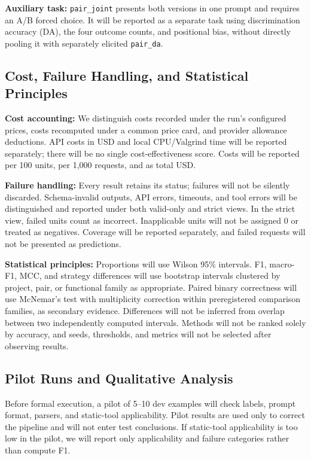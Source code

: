 \documentclass[conference]{IEEEtran}
\begin{document}
\textbf{Auxiliary task:} \texttt{pair\_joint} presents both versions in one prompt and requires an A/B forced choice. It will be reported as a separate task using discrimination accuracy (DA), the four outcome counts, and positional bias, without directly pooling it with separately elicited \texttt{pair\_da}.

\subsection{Cost, Failure Handling, and Statistical Principles}
\label{sec:eval-cost}

\textbf{Cost accounting:} We distinguish costs recorded under the run's configured prices, costs recomputed under a common price card, and provider allowance deductions. API costs in USD and local CPU/Valgrind time will be reported separately; there will be no single cost-effectiveness score. Costs will be reported per 100 units, per 1,000 requests, and as total USD.

\textbf{Failure handling:} Every result retains its status; failures will not be silently discarded. Schema-invalid outputs, API errors, timeouts, and tool errors will be distinguished and reported under both valid-only and strict views. In the strict view, failed units count as incorrect. Inapplicable units will not be assigned 0 or treated as negatives. Coverage will be reported separately, and failed requests will not be presented as predictions.

\textbf{Statistical principles:} Proportions will use Wilson 95\% intervals. F1, macro-F1, MCC, and strategy differences will use bootstrap intervals clustered by project, pair, or functional family as appropriate. Paired binary correctness will use McNemar's test with multiplicity correction within preregistered comparison families, as secondary evidence. Differences will not be inferred from overlap between two independently computed intervals. Methods will not be ranked solely by accuracy, and seeds, thresholds, and metrics will not be selected after observing results.

\subsection{Pilot Runs and Qualitative Analysis}
\label{sec:eval-pilot}

Before formal execution, a pilot of 5--10 dev examples will check labels, prompt format, parsers, and static-tool applicability. Pilot results are used only to correct the pipeline and will not enter test conclusions. If static-tool applicability is too low in the pilot, we will report only applicability and failure categories rather than compute F1.
\end{document}

